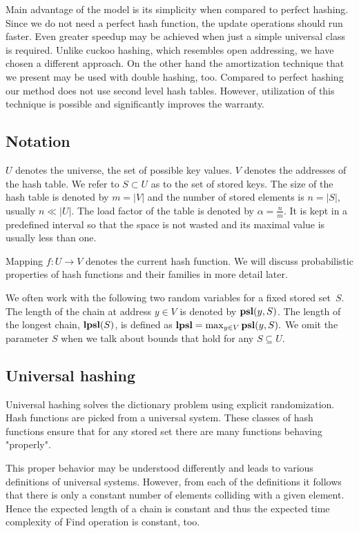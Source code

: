 Main advantage of the model is its simplicity when compared to perfect hashing. Since we do not need a perfect hash function, the update operations should run faster. Even greater speedup may be achieved when just a simple universal class is required. Unlike cuckoo hashing, which resembles open addressing, we have chosen a different approach. On the other hand the amortization technique that we present may be used with double hashing, too. Compared to perfect hashing our method does not use second level hash tables. However, utilization of this technique is possible and significantly improves the warranty.

\subsection{Notation}
$U$ denotes the universe, the set of possible key values. $V$ denotes the addresses of the hash table. We refer to $S \subset U$ as to the set of stored keys. The size of the hash table is denoted by $m = |V|$ and the number of stored elements is $n = |S|$, usually $n \ll |U|$. The load factor of the table is denoted by $\alpha = \frac{n}{m}$. It is kept in a predefined interval so that the space is not wasted and its maximal value is usually less than one.

Mapping $f\colon U \rightarrow V$ denotes the current hash function. We will discuss probabilistic properties of hash functions and their families in more detail later.

We often work with the following two random variables for a fixed stored set~$S$. The length of the chain at address $y \in V$ is denoted by $\mathbf{psl}(y, S)$. The length of the longest chain, $\mathbf{lpsl}(S)$, is defined as $\mathbf{lpsl} = \max_{y \in V} \mathbf{psl}(y, S).$ We omit the parameter $S$ when we talk about bounds that hold for any $S \subseteq U$.

\subsection{Universal hashing}
Universal hashing solves the dictionary problem using explicit randomization. Hash functions are picked from a universal system. These classes of hash functions ensure that for any stored set there are many functions  behaving "properly".

This proper behavior may be understood differently and leads to various definitions of universal systems. However, from each of the definitions it follows that there is only a constant number of elements colliding with a given element. Hence the expected length of a chain is constant and thus the expected time complexity of Find operation is constant, too.

